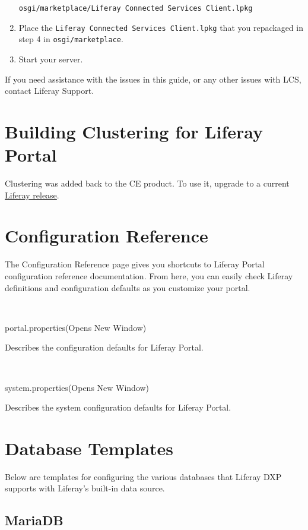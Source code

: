 \begin{enumerate}
\begin{verbatim}
osgi/marketplace/Liferay Connected Services Client.lpkg
\end{verbatim}
\item
  Place the \texttt{Liferay\ Connected\ Services\ Client.lpkg} that you
  repackaged in step 4 in \texttt{osgi/marketplace}.
\item
  Start your server.
\end{enumerate}

If you need assistance with the issues in this guide, or any other
issues with LCS, contact Liferay Support.

\section{Building Clustering for Liferay
Portal}\label{building-clustering-for-liferay-portal}

Clustering was added back to the CE product. To use it, upgrade to a
current \href{https://www.liferay.com/downloads-community}{Liferay
release}.

\section{Configuration Reference}\label{configuration-reference}

The Configuration Reference page gives you shortcuts to Liferay Portal
configuration reference documentation. From here, you can easily check
Liferay definitions and configuration defaults as you customize your
portal.

~

{ portal.properties{(Opens New Window)} }

Describes the configuration defaults for Liferay Portal.

~

{ system.properties{(Opens New Window)} }

Describes the system configuration defaults for Liferay Portal.

\section{Database Templates}\label{database-templates}

Below are templates for configuring the various databases that Liferay
DXP supports with Liferay's built-in data source.

\subsection{MariaDB}\label{mariadb}

